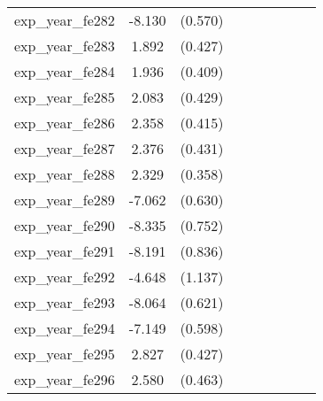 {\begin{tabular}{l*{4}{cc}}
exp\_year\_fe282&   -8.130\sym{***}&  (0.570)&                  &         &                  &         &                  &         \\
exp\_year\_fe283&    1.892\sym{***}&  (0.427)&                  &         &                  &         &                  &         \\
exp\_year\_fe284&    1.936\sym{***}&  (0.409)&                  &         &                  &         &                  &         \\
exp\_year\_fe285&    2.083\sym{***}&  (0.429)&                  &         &                  &         &                  &         \\
exp\_year\_fe286&    2.358\sym{***}&  (0.415)&                  &         &                  &         &                  &         \\
exp\_year\_fe287&    2.376\sym{***}&  (0.431)&                  &         &                  &         &                  &         \\
exp\_year\_fe288&    2.329\sym{***}&  (0.358)&                  &         &                  &         &                  &         \\
exp\_year\_fe289&   -7.062\sym{***}&  (0.630)&                  &         &                  &         &                  &         \\
exp\_year\_fe290&   -8.335\sym{***}&  (0.752)&                  &         &                  &         &                  &         \\
exp\_year\_fe291&   -8.191\sym{***}&  (0.836)&                  &         &                  &         &                  &         \\
exp\_year\_fe292&   -4.648\sym{***}&  (1.137)&                  &         &                  &         &                  &         \\
exp\_year\_fe293&   -8.064\sym{***}&  (0.621)&                  &         &                  &         &                  &         \\
exp\_year\_fe294&   -7.149\sym{***}&  (0.598)&                  &         &                  &         &                  &         \\
exp\_year\_fe295&    2.827\sym{***}&  (0.427)&                  &         &                  &         &                  &         \\
exp\_year\_fe296&    2.580\sym{***}&  (0.463)&                  &         &                  &         &                  &         \\

\end{tabular}}

